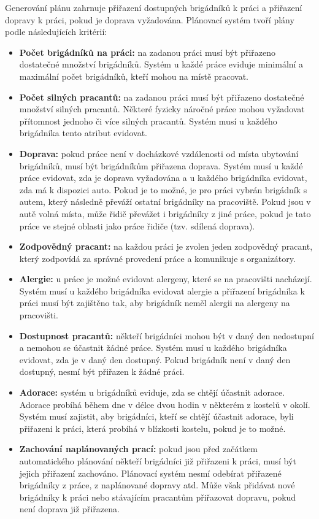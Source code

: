 Generování plánu zahrnuje přiřazení dostupných brigádníků k práci a přiřazení dopravy k práci, pokud je doprava vyžadována.
Plánovací systém tvoří plány podle následujících kritérií:
\begin{itemize}
    \item \textbf{Počet brigádníků na práci:} na zadanou práci musí být přiřazeno dostatečné množství brigádníků. Systém u každé práce eviduje minimální a maximální počet brigádníků, kteří mohou na místě pracovat. 
    \item \textbf{Počet silných pracantů:} na zadanou práci musí být přiřazeno dostatečné množství silných pracantů. Některé fyzicky náročné práce mohou vyžadovat přítomnost jednoho či více silných pracantů. Systém musí u každého brigádníka tento atribut evidovat.
    \item \textbf{Doprava:} pokud práce není v docházkové vzdálenosti od místa ubytování brigádníků, musí být brigádníkům přiřazena doprava. Systém musí u každé práce evidovat, zda je doprava vyžadována a u každého brigádníka evidovat, zda má k dispozici auto. Pokud je to možné, je pro práci vybrán brigádník s autem, který následně převáží ostatní brigádníky na pracoviště. Pokud jsou v autě volná místa, může řidič převážet i brigádníky z jiné práce, pokud je tato práce ve stejné oblasti jako práce řidiče (tzv. sdílená doprava).
    \item \textbf{Zodpovědný pracant:} na každou práci je zvolen jeden zodpovědný pracant, který zodpovídá za správné provedení práce a komunikuje s organizátory.
    \item \textbf{Alergie:} u práce je možné evidovat alergeny, které se na pracovišti nacházejí. Systém musí u každého brigádníka evidovat alergie a přiřazení brigádníka k práci musí být zajištěno tak, aby brigádník neměl alergii na alergeny na pracovišti.
    \item \textbf{Dostupnost pracantů:} někteří brigádníci mohou být v daný den nedostupní a nemohou se účastnit žádné práce. Systém musí u každého brigádníka evidovat, zda je v daný den dostupný. Pokud brigádník není v daný den dostupný, nesmí být přiřazen k žádné práci.
    \item \textbf{Adorace:} systém u brigádníků eviduje, zda se chtějí účastnit adorace. Adorace probíhá během dne v délce dvou hodin v některém z kostelů v okolí. Systém musí zajistit, aby brigádníci, kteří se chtějí účastnit adorace, byli přiřazeni k práci, která probíhá v blízkosti kostelu, pokud je to možné.
    \item \textbf{Zachování naplánovaných prací:} pokud jsou před začátkem automatického plánování někteří brigádníci již přiřazeni k práci, musí být jejich přiřazení zachováno. Plánovací systém nesmí odebírat přiřazené brigádníky z práce, z naplánované dopravy atd. Může však přidávat nové brigádníky k práci nebo stávajícím pracantům přiřazovat dopravu, pokud není doprava již přiřazena.
\end{itemize}

